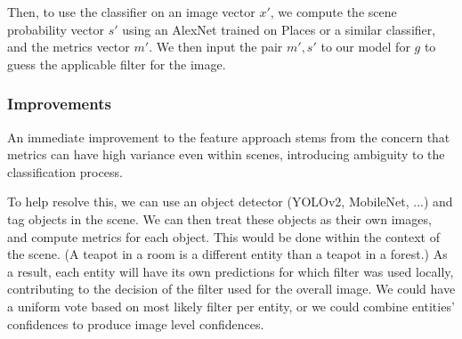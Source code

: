 \documentclass[a4paper, 11pt]{article}
\begin{document}
Then, to use the classifier on an image vector $x'$, we compute the scene probability vector $s'$ using an AlexNet trained on Places \cite{Places} or a similar classifier, and the metrics vector $m'$. We then input the pair $m', s'$ to our model for $g$ to guess the applicable filter for the image.


\subsubsection*{Improvements}
An immediate improvement to the feature approach stems from the concern that metrics can have high variance even within scenes, introducing ambiguity to the classification process. 

To help resolve this, we can use an object detector (YOLOv2, MobileNet, ...) and tag objects in the scene. We can then treat these objects as their own images, and compute metrics for each object. This would be done within the context of the scene. (A teapot in a room is a different entity than a teapot in a forest.) As a result, each entity will have its own predictions for which filter was used locally, contributing to the decision of the filter used for the overall image. We could have a uniform vote based on most likely filter per entity, or we could combine entities' confidences to produce image level confidences.



\end{document}
